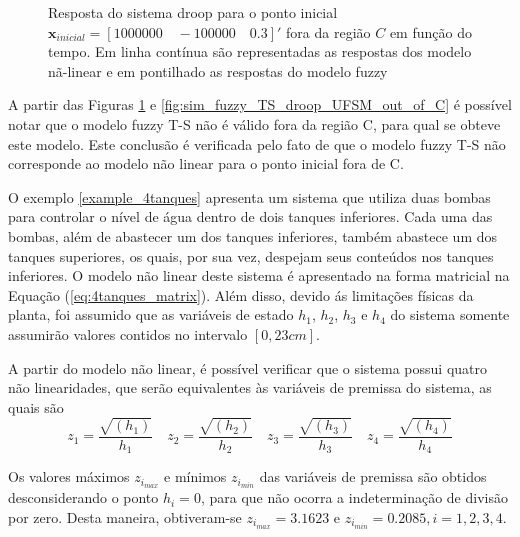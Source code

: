 \begin{figure}[htbp]
	\centering
	\qquad
	\qquad
	\caption{Resposta do sistema droop para o ponto inicial $\textbf{x}_{inicial} = [1000000\quad-100000\quad0.3]'$ fora da região $C$ em função do tempo. Em linha contínua são representadas as respostas dos modelo nã-linear e em pontilhado as respostas do modelo fuzzy}
	\label{fig:fuzzy_droop_out}
\end{figure}

A partir das Figuras \ref{fig:fuzzy_droop_out} e \ref{fig:sim_fuzzy_TS_droop_UFSM_out_of_C} é possível notar que o modelo fuzzy T-S não é válido fora da região C, para qual se obteve este modelo. Este conclusão é verificada pelo fato de que o modelo fuzzy T-S não corresponde ao modelo não linear para o ponto inicial fora de C.

\begin{example}\label{ex:4_tanques} O exemplo \ref{example_4tanques} apresenta um sistema que utiliza duas bombas para controlar o nível de água dentro de dois tanques inferiores. Cada uma das bombas, além de abastecer um dos tanques inferiores, também abastece um dos tanques superiores, os quais, por sua vez, despejam seus conteúdos nos tanques inferiores. O modelo não linear deste sistema é apresentado na forma matricial na Equação (\ref{eq:4tanques_matrix}). Além disso, devido ás limitações físicas da planta, foi assumido que as variáveis de estado $h_1$, $h_2$, $h_3$ e $h_4$ do sistema somente assumirão valores contidos no intervalo $[0, 23 cm]$.
\end{example}

A partir do modelo não linear, é possível verificar que o sistema possui quatro não linearidades, que serão equivalentes às variáveis de premissa do sistema, as quais são
\begin{equation*}
z_1 = \dfrac{\sqrt{(h_1)}}{h_1}\quad z_2 = \dfrac{\sqrt{(h_2)}}{h_2}\quad z_3 = \dfrac{\sqrt{(h_3)}}{h_3}\quad z_4 = \dfrac{\sqrt{(h_4)}}{h_4}
\end{equation*}

Os valores máximos $z_{i_{max}}$ e mínimos $z_{i_{min}}$ das variáveis de premissa são obtidos desconsiderando o ponto $h_i = 0$, para que não ocorra a indeterminação de divisão por zero. Desta maneira, obtiveram-se  $z_{i_{max}} = 3.1623$ e $z_{i_{min}} = 0.2085, i = 1, 2, 3, 4$.

